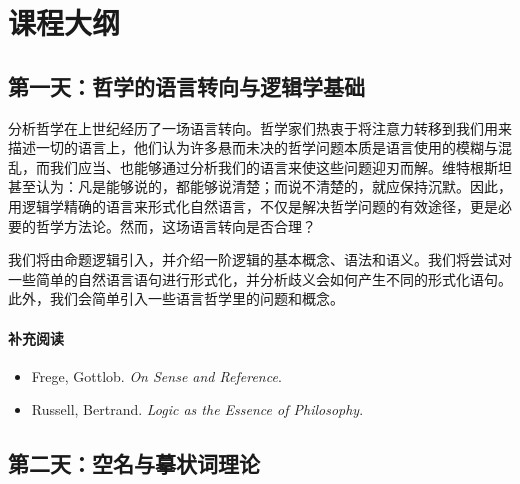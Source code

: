 \documentclass{article}
\begin{document}
\newpage
\section*{课程大纲}

\subsection*{第一天：哲学的语言转向与逻辑学基础}

分析哲学在上世纪经历了一场语言转向。哲学家们热衷于将注意力转移到我们用来描述一切的语言上，他们认为许多悬而未决的哲学问题本质是语言使用的模糊与混乱，而我们应当、也能够通过分析我们的语言来使这些问题迎刃而解。维特根斯坦甚至认为：凡是能够说的，都能够说清楚；而说不清楚的，就应保持沉默。因此，用逻辑学精确的语言来形式化自然语言，不仅是解决哲学问题的有效途径，更是必要的哲学方法论。然而，这场语言转向是否合理？

我们将由命题逻辑引入，并介绍一阶逻辑的基本概念、语法和语义。我们将尝试对一些简单的自然语言语句进行形式化，并分析歧义会如何产生不同的形式化语句。此外，我们会简单引入一些语言哲学里的问题和概念。%

\paragraph*{补充阅读}
\begin{itemize}
  \item Frege, Gottlob. \textit{On Sense and Reference}.
  \item Russell, Bertrand. \textit{Logic as the Essence of Philosophy}.
\end{itemize}



\subsection*{第二天：空名与摹状词理论}
\end{document}
